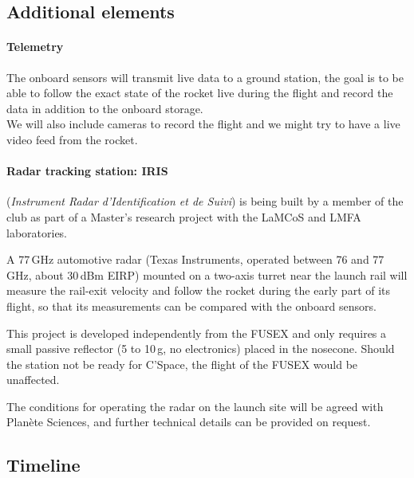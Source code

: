 \subsection{Additional elements}

\paragraph{Telemetry}

The onboard sensors will transmit live data to a ground station, the goal is to be able to follow the exact state of the rocket live during the flight and record the data in addition to the onboard storage.\\
We will also include cameras to record the flight and we might try to have a live video feed from the rocket.

\paragraph{Radar tracking station: IRIS}

(\textit{Instrument Radar d'Identification et de Suivi}) is being built by a member of the club as part of a Master's research project with the LaMCoS and LMFA laboratories.

A 77\,GHz automotive radar (Texas Instruments, operated between 76 and 77\,GHz, about 30\,dBm EIRP) mounted on a two-axis turret near the launch rail will measure the rail-exit velocity and follow the rocket during the early part of its flight, so that its measurements can be compared with the onboard sensors.

This project is developed independently from the FUSEX and only requires a small passive reflector (5 to 10\,g, no electronics) placed in the nosecone. Should the station not be ready for C'Space, the flight of the FUSEX would be unaffected.

The conditions for operating the radar on the launch site will be agreed with Planète Sciences, and further technical details can be provided on request.

\subsection{Timeline}

